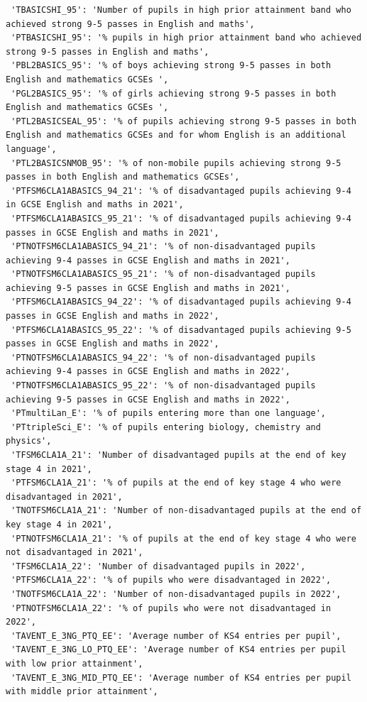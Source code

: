\documentclass[
  letterpaper,
  DIV=11,
  numbers=noendperiod]{scrartcl}
\begin{document}
\begin{verbatim}
 'TBASICSHI_95': 'Number of pupils in high prior attainment band who achieved strong 9-5 passes in English and maths',
 'PTBASICSHI_95': '% pupils in high prior attainment band who achieved strong 9-5 passes in English and maths',
 'PBL2BASICS_95': '% of boys achieving strong 9-5 passes in both English and mathematics GCSEs ',
 'PGL2BASICS_95': '% of girls achieving strong 9-5 passes in both English and mathematics GCSEs ',
 'PTL2BASICSEAL_95': '% of pupils achieving strong 9-5 passes in both English and mathematics GCSEs and for whom English is an additional language',
 'PTL2BASICSNMOB_95': '% of non-mobile pupils achieving strong 9-5 passes in both English and mathematics GCSEs',
 'PTFSM6CLA1ABASICS_94_21': '% of disadvantaged pupils achieving 9-4 in GCSE English and maths in 2021',
 'PTFSM6CLA1ABASICS_95_21': '% of disadvantaged pupils achieving 9-4 passes in GCSE English and maths in 2021',
 'PTNOTFSM6CLA1ABASICS_94_21': '% of non-disadvantaged pupils achieving 9-4 passes in GCSE English and maths in 2021',
 'PTNOTFSM6CLA1ABASICS_95_21': '% of non-disadvantaged pupils achieving 9-5 passes in GCSE English and maths in 2021',
 'PTFSM6CLA1ABASICS_94_22': '% of disadvantaged pupils achieving 9-4 passes in GCSE English and maths in 2022',
 'PTFSM6CLA1ABASICS_95_22': '% of disadvantaged pupils achieving 9-5 passes in GCSE English and maths in 2022',
 'PTNOTFSM6CLA1ABASICS_94_22': '% of non-disadvantaged pupils achieving 9-4 passes in GCSE English and maths in 2022',
 'PTNOTFSM6CLA1ABASICS_95_22': '% of non-disadvantaged pupils achieving 9-5 passes in GCSE English and maths in 2022',
 'PTmultiLan_E': '% of pupils entering more than one language',
 'PTtripleSci_E': '% of pupils entering biology, chemistry and physics',
 'TFSM6CLA1A_21': 'Number of disadvantaged pupils at the end of key stage 4 in 2021',
 'PTFSM6CLA1A_21': '% of pupils at the end of key stage 4 who were disadvantaged in 2021',
 'TNOTFSM6CLA1A_21': 'Number of non-disadvantaged pupils at the end of key stage 4 in 2021',
 'PTNOTFSM6CLA1A_21': '% of pupils at the end of key stage 4 who were not disadvantaged in 2021',
 'TFSM6CLA1A_22': 'Number of disadvantaged pupils in 2022',
 'PTFSM6CLA1A_22': '% of pupils who were disadvantaged in 2022',
 'TNOTFSM6CLA1A_22': 'Number of non-disadvantaged pupils in 2022',
 'PTNOTFSM6CLA1A_22': '% of pupils who were not disadvantaged in 2022',
 'TAVENT_E_3NG_PTQ_EE': 'Average number of KS4 entries per pupil',
 'TAVENT_E_3NG_LO_PTQ_EE': 'Average number of KS4 entries per pupil with low prior attainment',
 'TAVENT_E_3NG_MID_PTQ_EE': 'Average number of KS4 entries per pupil with middle prior attainment',

\end{verbatim}
\end{document}
